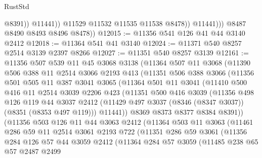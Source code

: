 \begin{lexlean}{RustStd}
\begin{coremodule}
                          @8391))
                      @11441))
                  @11529
                  @11532
                  @11535
                  @11538
                  @8478))
              @11441)))
        @8487
        @8490
        @8493
        @8496
        @8478))
@12015 := @11356 @541 @126 @41 @44 @3140 @2412
@12018 := @11364 @541 @41 @3140
@12024 := @11371 @540 @8257 @2514 @3139 @2397 @8266
@12027 := @11351 @540 @8257 @3139
@12161 := @11356
    @507
    @539
    @11
    @45
    @3068
    @3138
    (@11364
      @507
      @11
      @3068
      (@11390
        @506
        @388
        @11
        @2514
        @3066
        @2193
        @413
        (@11351
          @506
          @388
          @3066
          (@11356
            @501
            @505
            @11
            @387
            @3041
            @3065
            (@11364
              @501
              @11
              @3041
              (@11410
                @500
                @416
                @11
                @2514
                @3039
                @2206
                @423
                (@11351
                  @500
                  @416
                  @3039
                  (@11356
                    @498
                    @126
                    @119
                    @44
                    @3037
                    @2412
                    (@11429 @497 @3037 (@8346 (@8347 @3037)) (@8351 (@8353 @497 @119)))
                    @11441))
                @8369
                @8373
                @8377
                @8384
                @8391))
            (@11356
              @503
              @126
              @11
              @44
              @3063
              @2412
              (@11364
                @503
                @11
                @3063
                (@11461
                  @286
                  @59
                  @11
                  @2514
                  @3061
                  @2193
                  @722
                  (@11351
                    @286
                    @59
                    @3061
                    (@11356
                      @284
                      @126
                      @57
                      @44
                      @3059
                      @2412
                      (@11364
                        @284
                        @57
                        @3059
                        (@11485
                          @238
                          @65
                          @57
                          @2487
                          @2499

\end{coremodule}
\end{lexlean}

